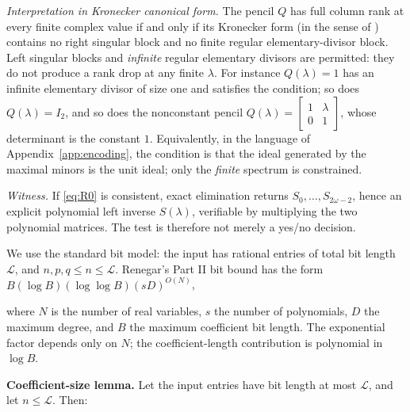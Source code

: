 \documentclass[journal]{IEEEtran}
\theoremstyle{plainn}
\theoremstyle{remark}
\begin{document}
\emph{Interpretation in Kronecker canonical form.} The pencil $Q$ has full column rank at every finite complex value if and only if its Kronecker form (in the sense of \cite{bee88}) contains no right singular block and no finite regular elementary-divisor block. Left singular blocks and \emph{infinite} regular elementary divisors are permitted: they do not produce a rank drop at any finite $\lambda$. For instance $Q(\lambda)=1$ has an infinite elementary divisor of size one and satisfies the condition; so does $Q(\lambda)=I_2$, and so does the nonconstant pencil $Q(\lambda)=\begin{bmatrix}1&\lambda\\0&1\end{bmatrix}$, whose determinant is the constant $1$. Equivalently, in the language of Appendix~\ref{app:encoding}, the condition is that the ideal generated by the maximal minors is the unit ideal; only the \emph{finite} spectrum is constrained.

\emph{Witness.} If \eqref{eq:R0} is consistent, exact elimination returns $S_0,\dots,S_{2\omega-2}$, hence an explicit polynomial left inverse $S(\lambda)$, verifiable by multiplying the two polynomial matrices. The test is therefore not merely a yes/no decision.


We use the standard bit model: the input has rational entries of total bit length $\mathcal L$, and $n,p,q\le n\le\mathcal L$. Renegar's Part II bit bound \cite{ren92} has the form $B(\log B)(\log\log B)(sD)^{O(N)}$,

where $N$ is the number of real variables, $s$ the number of polynomials, $D$ the maximum degree, and $B$ the maximum coefficient bit length. The exponential factor depends only on $N$; the coefficient-length contribution is polynomial in $\log B$.

\textbf{Coefficient-size lemma.} Let the input entries have bit length at most $\mathcal L$, and let $n\le\mathcal L$. Then:
\end{document}
